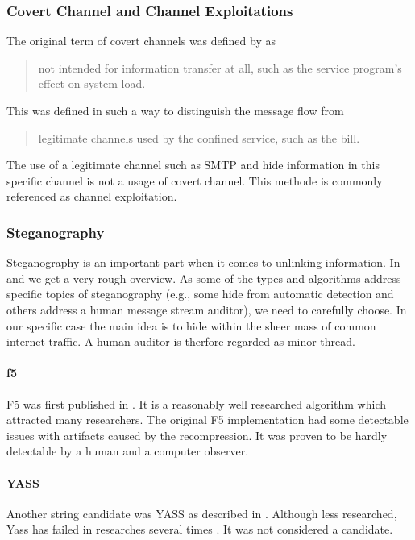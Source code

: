 \subsubsection{Covert Channel and Channel Exploitations}
The original term of covert channels was defined by \citeauthor{Lampson73anote}\cite{Lampson73anote} as 
\begin{quote}
	not intended for information transfer at all, such as the service program's effect on system load.
\end{quote}

This was defined  in such a way to distinguish the message flow from 
\begin{quote}
	legitimate channels used by the confined service, such as the bill.
\end{quote}

The use of a legitimate channel such as SMTP and hide information in this specific channel is not a usage of covert channel. This methode is commonly referenced as channel exploitation.

\subsubsection{Steganography}
Steganography is an important part when it comes to unlinking information. In \cite{6828087} and \cite{subhedar2014current} we get a very rough overview. As some of the types and algorithms address specific topics of steganography (e.g., some hide from automatic detection and others address a human message stream auditor), we need to carefully choose. In our specific case the main idea is to hide within the sheer mass of common internet traffic. A human auditor is therfore regarded as minor thread.

\paragraph{f5}
F5 was first published in \cite{f5}. It is a reasonably well researched algorithm which attracted many researchers. The original F5 implementation had some detectable issues with artifacts\cite{F5broken} caused by the recompression. It was proven to be hardly detectable by a human and a computer observer.


\paragraph{YASS}
Another string candidate was YASS as described in \cite{solanki2007yass}. Although less researched, Yass has failed in researches several times \cite{kodovsky2010modern}\cite{li2009steganalysis}. It was not considered a candidate.


